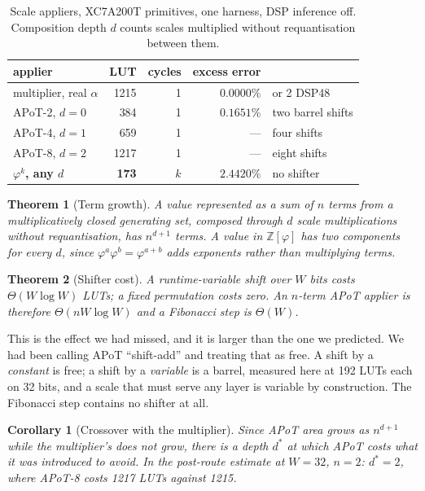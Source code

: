 \documentclass[11pt]{article}
\newtheorem{theorem}{Theorem}
\newtheorem{corollary}{Corollary}
\theoremstyle{definition}
\begin{document}
\begin{table}[t]\centering
\caption{Scale appliers, XC7A200T primitives, one harness, DSP inference off.
Composition depth $d$ counts scales multiplied without requantisation between
them.}
\label{tab:scalefrontier}
\begin{tabular}{lrrrl}
\toprule
applier & LUT & cycles & excess error & \\
\midrule
multiplier, real $\alpha$ & 1215 & 1 & $0.0000\%$ & or 2 DSP48 \\
APoT-2, $d=0$ & 384 & 1 & $0.1651\%$ & two barrel shifts \\
APoT-4, $d=1$ & 659 & 1 & --- & four shifts \\
APoT-8, $d=2$ & 1217 & 1 & --- & eight shifts \\
\textbf{$\varphi^{k}$, any $d$} & \textbf{173} & $k$ & $2.4420\%$ & no shifter \\
\bottomrule
\end{tabular}
\end{table}

\begin{theorem}[Term growth]
\label{thm:termgrowth}
A value represented as a sum of $n$ terms from a multiplicatively closed
generating set, composed through $d$ scale multiplications without
requantisation, has $n^{d+1}$ terms. A value in $\mathbb{Z}[\varphi]$ has two
components for every $d$, since $\varphi^{a}\varphi^{b} = \varphi^{a+b}$ adds
exponents rather than multiplying terms.
\end{theorem}

\begin{theorem}[Shifter cost]
\label{thm:shifter}
A runtime-variable shift over $W$ bits costs $\Theta(W\log W)$ LUTs; a fixed
permutation costs zero. An $n$-term APoT applier is therefore
$\Theta(nW\log W)$ and a Fibonacci step is $\Theta(W)$.
\end{theorem}

This is the effect we had missed, and it is larger than the one we predicted. We
had been calling APoT ``shift-add'' and treating that as free. A shift by a
\emph{constant} is free; a shift by a \emph{variable} is a barrel, measured here
at 192 LUTs each on 32 bits, and a scale that must serve any layer is variable by
construction. The Fibonacci step contains no shifter at all.

\begin{corollary}[Crossover with the multiplier]
\label{cor:crossover}
Since APoT area grows as $n^{d+1}$ while the multiplier's does not grow, there is
a depth $d^{*}$ at which APoT costs what it was introduced to avoid. In the post-route estimate at
$W=32$, $n=2$: $d^{*}=2$, where APoT-8 costs 1217 LUTs against 1215.
\end{corollary}
\end{document}
